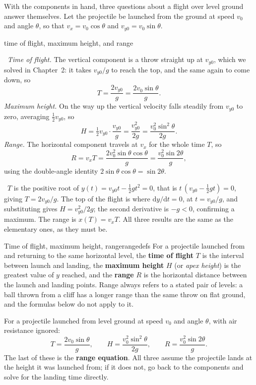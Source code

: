 \documentclass[11pt,twoside,openany]{book}
\newcommand{\dd}{\mathrm{d}}
\newcommand{\viewtag}[3]{\fcolorbox{#2}{#3}{\footnotesize\textbf{\textcolor{#2}{#1}}}}
\newcommand{\elemtag}{\viewtag{Elementary}{elemcol}{elempale}}
\newcommand{\calctag}{\viewtag{Calculus}{calccol}{calcpale}}
\newcommand{\elem}{\par\medskip\noindent\elemtag\ }
\newcommand{\calc}{\par\medskip\noindent\calctag\ }
\begin{document}
With the components in hand, three questions about a flight over level ground answer themselves. Let the projectile be launched from the ground at speed $v_0$ and angle $\theta$, so that $v_x = v_0\cos\theta$ and $v_{y0} = v_0\sin\theta$.

\begin{twoviews}{time of flight, maximum height, and range}
\elem \emph{Time of flight.} The vertical component is a throw straight up at $v_{y0}$, which we solved in Chapter~2: it takes $v_{y0}/g$ to reach the top, and the same again to come down, so
\[
T = \frac{2v_{y0}}{g} = \frac{2v_0\sin\theta}{g}.
\]
\emph{Maximum height.} On the way up the vertical velocity falls steadily from $v_{y0}$ to zero, averaging $\tfrac12 v_{y0}$, so
\[
H = \tfrac12 v_{y0}\cdot\frac{v_{y0}}{g} = \frac{v_{y0}^{2}}{2g} = \frac{v_0^{2}\sin^{2}\theta}{2g}.
\]
\emph{Range.} The horizontal component travels at $v_x$ for the whole time $T$, so
\[
R = v_x T = \frac{2 v_0^{2}\sin\theta\cos\theta}{g} = \frac{v_0^{2}\sin 2\theta}{g},
\]
using the double-angle identity $2\sin\theta\cos\theta = \sin 2\theta$.

\calc $T$ is the positive root of $y(t) = v_{y0}t - \tfrac12 g t^2 = 0$, that is $t\,(v_{y0} - \tfrac12 g t) = 0$, giving $T = 2v_{y0}/g$. The top of the flight is where $\dd y/\dd t = 0$, at $t = v_{y0}/g$, and substituting gives $H = v_{y0}^2/2g$; the second derivative is $-g < 0$, confirming a maximum. The range is $x(T) = v_x T$. All three results are the same as the elementary ones, as they must be.
\end{twoviews}

\begin{definition}{Time of flight, maximum height, range}{rangedefs}
For a projectile launched from and returning to the same horizontal level, the \textbf{time of flight} $T$ is the interval between launch and landing, the \textbf{maximum height} $H$ (or \emph{apex height}) is the greatest value of $y$ reached, and the \textbf{range} $R$ is the horizontal distance between the launch and landing points. Range always refers to a stated pair of levels: a ball thrown from a cliff has a longer range than the same throw on flat ground, and the formulas below do not apply to it.
\end{definition}

\begin{keyidea}
For a projectile launched from level ground at speed $v_0$ and angle $\theta$, with air resistance ignored:
\[
T = \frac{2v_0\sin\theta}{g}, \qquad
H = \frac{v_0^{2}\sin^{2}\theta}{2g}, \qquad
R = \frac{v_0^{2}\sin 2\theta}{g}.
\]
The last of these is the \textbf{range equation}. All three assume the projectile lands at the height it was launched from; if it does not, go back to the components and solve for the landing time directly.
\end{keyidea}
\end{document}
